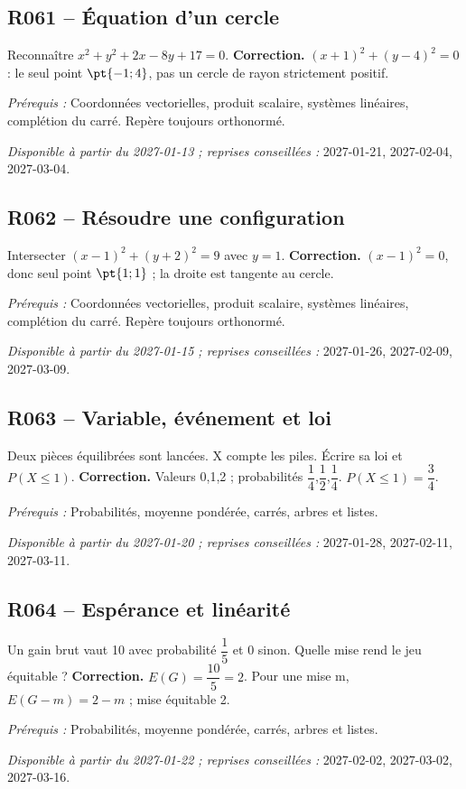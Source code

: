 \subsection*{R061 -- Équation d’un cercle}\label{R061}
Reconnaître $x^2+y^2+2x-8y+17=0$.
\ifmxteacher\textbf{Correction.} $(x+1)^2+(y-4)^2=0$ : le seul point $\pt{-1;4}$, pas un cercle de rayon strictement positif.\par\textit{Prérequis :} Coordonnées vectorielles, produit scalaire, systèmes linéaires, complétion du carré. Repère toujours orthonormé.\par\textit{Disponible à partir du 2027-01-13 ; reprises conseillées :} 2027-01-21, 2027-02-04, 2027-03-04.\fi
{}\subsection*{R062 -- Résoudre une configuration}\label{R062}
Intersecter $(x-1)^2+(y+2)^2=9$ avec $y=1$.
\ifmxteacher\textbf{Correction.} $(x-1)^2=0$, donc seul point $\pt{1;1}$ ; la droite est tangente au cercle.\par\textit{Prérequis :} Coordonnées vectorielles, produit scalaire, systèmes linéaires, complétion du carré. Repère toujours orthonormé.\par\textit{Disponible à partir du 2027-01-15 ; reprises conseillées :} 2027-01-26, 2027-02-09, 2027-03-09.\fi
{}\subsection*{R063 -- Variable, événement et loi}\label{R063}
Deux pièces équilibrées sont lancées. X compte les piles. Écrire sa loi et $P(X\leq1)$.
\ifmxteacher\textbf{Correction.} Valeurs 0,1,2 ; probabilités $\dfrac{1}{4}$,$\dfrac{1}{2}$,$\dfrac{1}{4}$. $P(X\leq1)=\dfrac{3}{4}$.\par\textit{Prérequis :} Probabilités, moyenne pondérée, carrés, arbres et listes.\par\textit{Disponible à partir du 2027-01-20 ; reprises conseillées :} 2027-01-28, 2027-02-11, 2027-03-11.\fi
{}\subsection*{R064 -- Espérance et linéarité}\label{R064}
Un gain brut vaut 10 avec probabilité $\dfrac{1}{5}$ et 0 sinon. Quelle mise rend le jeu équitable ?
\ifmxteacher\textbf{Correction.} $E(G)=\dfrac{10}{5}=2$. Pour une mise m, $E(G-m)=2-m$ ; mise équitable 2.\par\textit{Prérequis :} Probabilités, moyenne pondérée, carrés, arbres et listes.\par\textit{Disponible à partir du 2027-01-22 ; reprises conseillées :} 2027-02-02, 2027-03-02, 2027-03-16.\fi

